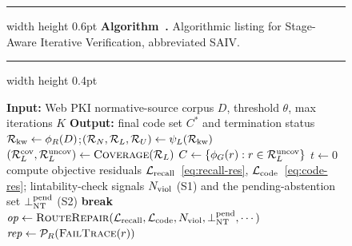 %
\newpage
\begin{figure}[H]
\raggedright
\setlength{\parskip}{0pt}
\makeatletter
{}%
\makeatother
{}
\label{alg:saiv}
\hrule width \linewidth height 0.6pt\relax
\vspace{1pt}
\nointerlineskip
\noindent\textbf{Algorithm~\thealgorithm.} Algorithmic listing for
Stage-Aware Iterative Verification, abbreviated SAIV.
\par
\vspace{1pt}
\nointerlineskip
\hrule width \linewidth height 0.4pt\relax
\nointerlineskip
\small
\algrenewcommand\algorithmicindent{1em}
\begin{algorithmic}[1]
\Statex \textbf{Input:} Web PKI normative-source corpus $D$, threshold $\theta$, max iterations $K$
\Statex \textbf{Output:} final code set $C^{*}$ and termination status
\State $\mathcal{R}_{\mathrm{kw}} \gets \phi_R(D)$;\quad $(\mathcal{R}_N,\mathcal{R}_L,\mathcal{R}_U)\gets \psi_L(\mathcal{R}_{\mathrm{kw}})$
\Statex {}
\State $(\mathcal{R}_L^{\mathrm{cov}},\mathcal{R}_L^{\mathrm{uncov}})\gets \textsc{Coverage}(\mathcal{R}_L)$
\State $C \gets \{\phi_G(r): r\in \mathcal{R}_L^{\mathrm{uncov}}\}$
\State $t\gets 0$
\Repeat
  \State compute objective residuals $\mathcal{L}_{\mathrm{recall}}$~\eqref{eq:recall-res},
    $\mathcal{L}_{\mathrm{code}}$~\eqref{eq:code-res}; lintability-check signals $N_{\mathrm{viol}}$ (S1) and the
    pending-abstention set $\bot_{\mathrm{NT}}^{\mathrm{pend}}$ (S2)
    \State \textbf{break} 
  \EndIf
  \State $\mathit{op}\gets \textsc{RouteRepair}(\mathcal{L}_{\mathrm{recall}},\mathcal{L}_{\mathrm{code}},N_{\mathrm{viol}},\bot_{\mathrm{NT}}^{\mathrm{pend}},\cdots)$
  \Statex {}
   
      \State $\mathit{rep}\gets \mathcal{P}_R(\textsc{FailTrace}(r))$
\end{algorithmic}
\end{figure}
